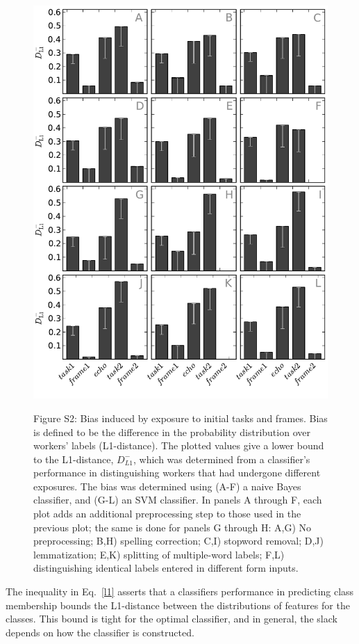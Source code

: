 \documentclass[12pt]{article}
\begin{document}
\begin{figure}
	\centering
	\includegraphics[scale=0.75]{figs/theta_sup.pdf}
	\label{fig:theta_sup}
	\caption{
		Figure S2: Bias induced by exposure to initial tasks and frames.
		Bias is defined to be the difference in the probability 
		distribution over workers' labels (L1-distance).  The plotted values
		give a lower bound to the L1-distance, $D_{L1}^-$, which was 
		determined from a classifier's performance in 
		distinguishing workers that had undergone different exposures.
		The bias was determined using (A-F) a naive Bayes classifier, and 
		(G-L) an SVM classifier.
		In panels A through F, each plot adds an additional
		preprocessing step to those used in the previous plot; the same is 
		done for panels G through H: A,G) No 
		preprocessing; B,H) spelling correction; C,I) stopword removal; 
		D,J) lemmatization; E,K) splitting of multiple-word labels; 
		F,L) distinguishing identical labels entered in different form inputs.
	}
\end{figure}
The inequality in Eq.~\ref{l1}
asserts that a classifiers performance in predicting class membership
bounds the L1-distance between the distributions of features for the classes.
This bound is tight for the optimal classifier, and in general, the slack
depends on how the classifier is constructed.
\end{document}
